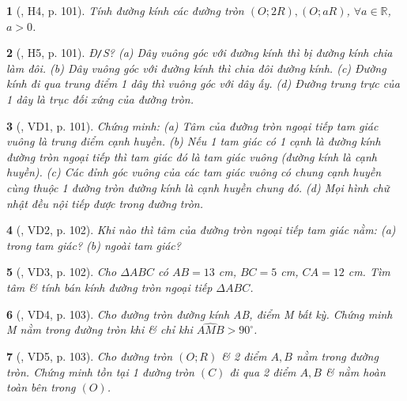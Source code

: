\documentclass{article}
\newtheorem{baitoan}{}
\begin{document}
\begin{baitoan}[\cite{Binh_boi_duong_Toan_9_tap_1}, H4, p. 101]
	Tính đường kính các đường tròn $(O;2R),(O;aR)$, $\forall a\in\mathbb{R}$, $a > 0$.
\end{baitoan}

\begin{baitoan}[\cite{Binh_boi_duong_Toan_9_tap_1}, H5, p. 101]
	{\rm Đ{\tt/}S?} (a) Dây vuông góc với đường kính thì bị đường kính chia làm đôi. (b) Dây vuông góc với đường kính thì chia đôi đường kính. (c) Đường kính đi qua trung điểm 1 dây thì vuông góc với dây ấy. (d) Đường trung trực của 1 dây là trục đối xứng của đường tròn.
\end{baitoan}

\begin{baitoan}[\cite{Binh_boi_duong_Toan_9_tap_1}, VD1, p. 101]
	Chứng minh: (a) Tâm của đường tròn ngoại tiếp tam giác vuông là trung điểm cạnh huyền. (b) Nếu 1 tam giác có 1 cạnh là đường kính đường tròn ngoại tiếp thì tam giác đó là tam giác vuông (đường kính là cạnh huyền). (c) Các đỉnh góc vuông của các tam giác vuông có chung cạnh huyền cùng thuộc 1 đường tròn đường kính là cạnh huyền chung đó. (d) Mọi hình chữ nhật đều nội tiếp được trong đường tròn.
\end{baitoan}

\begin{baitoan}[\cite{Binh_boi_duong_Toan_9_tap_1}, VD2, p. 102]
	Khi nào thì tâm của đường tròn ngoại tiếp tam giác nằm: (a) trong tam giác? (b) ngoài tam giác?
\end{baitoan}

\begin{baitoan}[\cite{Binh_boi_duong_Toan_9_tap_1}, VD3, p. 102]
	Cho $\Delta ABC$ có $AB = 13$ {\rm cm}, $BC = 5$ {\rm cm}, $CA = 12$ {\rm cm}. Tìm tâm \& tính bán kính đường tròn ngoại tiếp $\Delta ABC$.
\end{baitoan}

\begin{baitoan}[\cite{Binh_boi_duong_Toan_9_tap_1}, VD4, p. 103]
	Cho đường tròn đường kính AB, điểm M bất kỳ. Chứng minh M nằm trong đường tròn khi \& chỉ khi $\widehat{AMB} > 90^\circ$.
\end{baitoan}

\begin{baitoan}[\cite{Binh_boi_duong_Toan_9_tap_1}, VD5, p. 103]
	Cho đường tròn $(O;R)$ \& 2 điểm $A,B$ nằm trong đường tròn. Chứng minh tồn tại 1 đường tròn $(C)$ đi qua 2 điểm $A,B$ \& nằm hoàn toàn bên trong $(O)$.
\end{baitoan}
\end{document}

